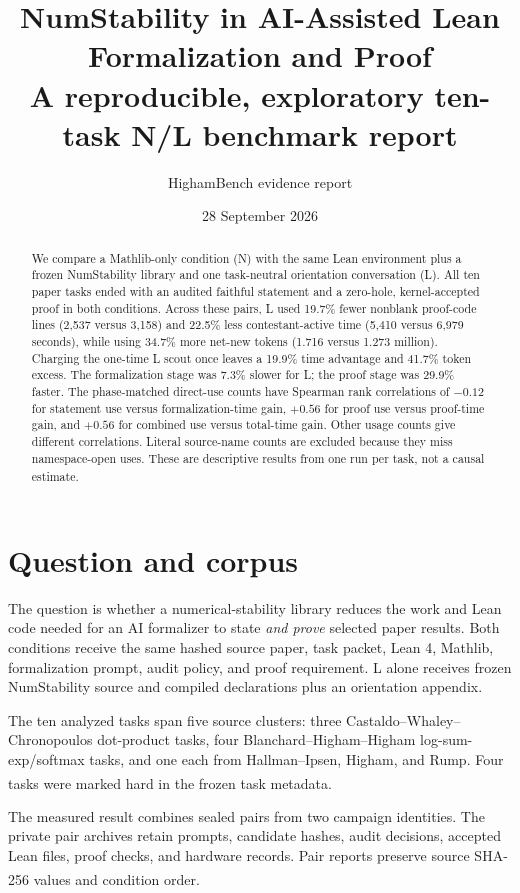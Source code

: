 \documentclass[10pt,a4paper]{article}
\title{\vspace{-13mm}\textbf{NumStability in AI-Assisted Lean Formalization and Proof}\\[2mm]
\large A reproducible, exploratory ten-task N/L benchmark report}
\author{HighamBench evidence report}
\date{28 September 2026}
\newcommand{\src}[1]{\textsuperscript{\cite{#1}}}
\begin{document}
\maketitle

\begin{abstract}
We compare a Mathlib-only condition (N) with the same Lean environment plus a
frozen NumStability library and one task-neutral orientation conversation (L).
All ten paper tasks ended with an audited faithful statement and a
zero-hole, kernel-accepted proof in both conditions. Across these pairs, L
used 19.7\% fewer nonblank proof-code lines (2,537 versus 3,158) and 22.5\%
less contestant-active time (5,410 versus 6,979 seconds), while using 34.7\%
more net-new tokens (1.716 versus 1.273 million). Charging the one-time L
scout once leaves a 19.9\% time advantage and 41.7\% token excess. The
formalization stage was 7.3\% slower for L; the proof stage was 29.9\% faster.
The phase-matched direct-use counts have Spearman rank correlations of
$-0.12$ for statement use versus formalization-time gain, $+0.56$ for
proof use versus proof-time gain, and $+0.56$ for combined use versus
total-time gain. Other usage counts give different correlations.
Literal source-name counts are excluded because they miss namespace-open uses. These
are descriptive results from one run per task, not a causal estimate.
\src{summary,taskledger,usagepoints}
\end{abstract}

\section{Question and corpus}

The question is whether a numerical-stability library reduces the work and
Lean code needed for an AI formalizer to state \emph{and prove} selected paper
results. Both conditions receive the same hashed source paper, task packet,
Lean 4, Mathlib, formalization prompt, audit policy, and proof requirement. L
alone receives frozen NumStability source and compiled declarations plus an
orientation appendix.

The ten analyzed tasks span five source clusters: three Castaldo--Whaley--
Chronopoulos dot-product tasks, four Blanchard--Higham--Higham
log-sum-exp/softmax tasks, and one each from Hallman--Ipsen, Higham, and Rump.
Four tasks were marked hard in the frozen task metadata.
\src{summary,registry,taskledger}

The measured result combines sealed pairs from two campaign identities.
The private pair archives retain prompts, candidate hashes, audit decisions,
accepted Lean files, proof checks, and hardware records. Pair reports
preserve source SHA-256 values and condition order.
\src{taskledger,evidence}
\end{document}
